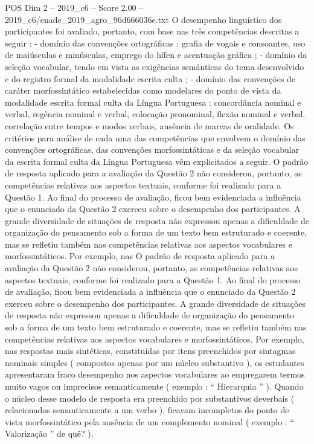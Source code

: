 \begin{textsample}{POS Dim 2 – 2019\_c6 – Score 2.00 – 2019\_c6/enade\_2019\_agro\_96d666036e.txt}
O desempenho linguístico dos participantes foi avaliado, portanto, com base nas três competências descritas a seguir : - domínio das convenções ortográficas : grafia de vogais e consoantes, uso de maiúsculas e minúsculas, emprego do hífen e acentuação gráfica ; - domínio da seleção vocabular, tendo em vista as exigências semânticas do tema desenvolvido e do registro formal da modalidade escrita culta ; - domínio das convenções de caráter morfossintático estabelecidas como modelares do ponto de vista da modalidade escrita formal culta da Língua Portuguesa : concordância nominal e verbal, regência nominal e verbal, colocação pronominal, flexão nominal e verbal, correlação entre tempos e modos verbais, ausência de marcas de oralidade.
Os critérios para análise de cada uma das competências que envolvem o domínio das convenções ortográficas, das convenções morfossintáticas e da seleção vocabular da escrita formal culta da Língua Portuguesa vêm explicitados a seguir.
O padrão de resposta aplicado para a avaliação da Questão 2 não considerou, portanto, as competências relativas aos aspectos textuais, conforme foi realizado para a Questão 1.
Ao final do processo de avaliação, ficou bem evidenciada a influência que o enunciado da Questão 2 exerceu sobre o desempenho dos participantes.
A grande diversidade de situações de resposta não expressou apenas a dificuldade de organização do pensamento sob a forma de um texto bem estruturado e coerente, mas se refletiu também nas competências relativas aos aspectos vocabulares e morfossintáticos.
Por exemplo, nas O padrão de resposta aplicado para a avaliação da Questão 2 não considerou, portanto, as competências relativas aos aspectos textuais, conforme foi realizado para a Questão 1.
Ao final do processo de avaliação, ficou bem evidenciada a influência que o enunciado da Questão 2 exerceu sobre o desempenho dos participantes.
A grande diversidade de situações de resposta não expressou apenas a dificuldade de organização do pensamento sob a forma de um texto bem estruturado e coerente, mas se refletiu também nas competências relativas aos aspectos vocabulares e morfossintáticos.
Por exemplo, nas respostas mais sintéticas, constituídas por itens preenchidos por sintagmas nominais simples ( compostos apenas por um núcleo substantivo ), os estudantes apresentaram fraco desempenho nos aspectos vocabulares ao empregarem termos muito vagos ou imprecisos semanticamente ( exemplo : “ Hierarquia ” ).
Quando o núcleo desse modelo de resposta era preenchido por substantivos deverbais ( relacionados semanticamente a um verbo ), ficavam incompletos do ponto de vista morfossintático pela ausência de um complemento nominal ( exemplo : “ Valorização ” de quê? ).

\end{textsample}
